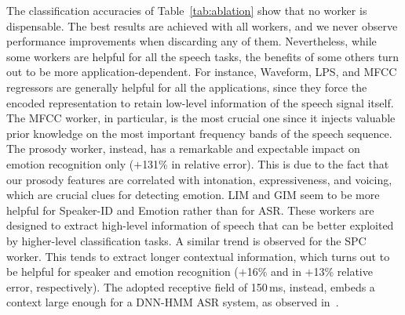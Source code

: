 \documentclass[a4paper]{article}
\begin{document}
The classification accuracies of Table~\ref{tab:ablation} show that no worker is dispensable. The best results are achieved with all workers, and we never observe performance improvements when discarding any of them. Nevertheless, while some workers are helpful for all the speech tasks, the benefits of some others turn out to be more application-dependent. For instance, Waveform, LPS, and MFCC regressors are generally helpful for all the applications, since they force the encoded representation to retain low-level information of the speech signal itself. The MFCC worker, in particular, is the most crucial one since it injects valuable prior knowledge on the most important frequency bands of the speech sequence. The prosody worker, instead, has a remarkable and expectable impact on emotion recognition only ($+$131\% in relative error). This is due to the fact that our prosody features are correlated with intonation, expressiveness, and voicing, which are crucial clues for detecting emotion. LIM and GIM seem to be more helpful for Speaker-ID and Emotion rather than for ASR. These workers are designed to extract high-level information of speech that can be better exploited by higher-level classification tasks. A similar trend is observed for the SPC worker. This tends to extract longer contextual information, which turns out to be helpful for speaker and emotion recognition ($+$16\% and in $+$13\% relative error, respectively). 
The adopted receptive field of 150\,ms, instead, embeds a context large enough for a DNN-HMM ASR system, as observed in~\cite{ravanelli_context}.
\end{document}
